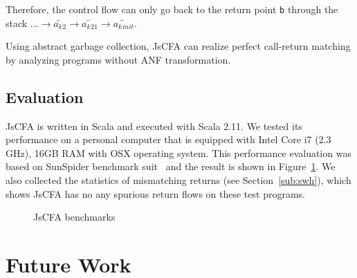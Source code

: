 \documentclass[12pt]{report}
\begin{document}
Therefore, the control flow can only go back to the return point \verb|b| through the stack $\dots \to \widetilde{a_k{}_{2}} \to \widetilde{a_k{}_{21}} \to \widetilde{a_k{}_{init}}$.

Using abstract garbage collection, JsCFA can realize perfect call-return matching by analyzing programs without ANF transformation.

\section{Evaluation}
\label{sub:Performance Evaluation}
JsCFA is written in Scala and executed with Scala 2.11.
We tested its performance on a personal computer that is equipped with Intel Core i7 (2.3 GHz), 16GB RAM with OSX operating system.
This performance evaluation was based on SunSpider benchmark suit~\cite{sunspider} and the result is shown in Figure~\ref{jscfa-benchmark}.
We also collected the statistics of mismatching returns (see Section~\ref{sub:swh}), which shows JsCFA has no any spurious return flows on these test programs.

\begin{figure}
  \centering
  \caption{JsCFA benchmarks}
  \label{jscfa-benchmark}
\end{figure}

\chapter{Future Work}
\label{sec:Future}
\end{document}
